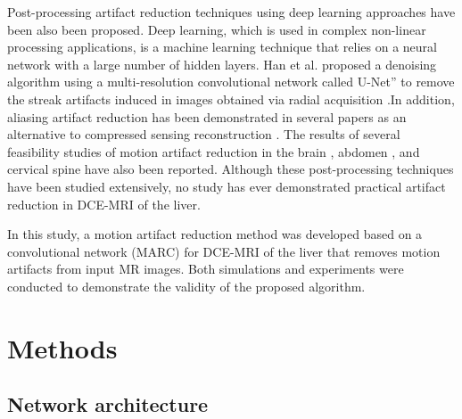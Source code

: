 \documentclass[num-refs]{wiley-article}
\begin{document}
Post-processing artifact reduction techniques using deep learning approaches have been also been proposed. Deep learning, which is used in complex non-linear processing applications, is a machine learning technique that relies on a neural network with a large number of hidden layers. Han et al. proposed a denoising algorithm using a multi-resolution convolutional network called U-Net” to remove the streak artifacts induced in images obtained via radial acquisition \cite{han2018deep}.In addition, aliasing artifact reduction has been demonstrated in several papers as an alternative to compressed sensing reconstruction \cite{lee2017deep}\cite{yang2018dagan}\cite{hyun2018deep}. The results of several feasibility studies of motion artifact reduction in the brain \cite{Karsten2018ismrm}\cite{Patricia2018ismrm}\cite{Kamlesh2018ismrm}, abdomen \cite{Daiki2018ismrm}, and cervical spine \cite{Hongpyo2018ismrm} have also been reported. Although these post-processing techniques have been studied extensively, no study has ever demonstrated practical artifact reduction in DCE-MRI of the liver.


In this study, a motion artifact reduction method was developed based on a convolutional network (MARC) for DCE-MRI of the liver that removes motion artifacts from input MR images. Both simulations and experiments were conducted to demonstrate the validity of the proposed algorithm.



\section{Methods}



\subsection{Network architecture}
\end{document}
